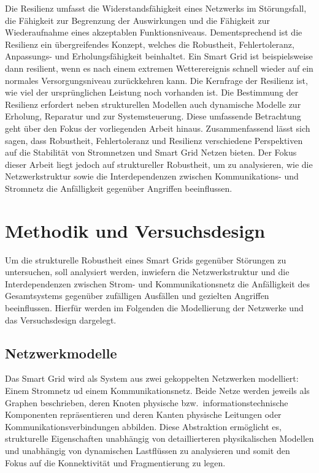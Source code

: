 \documentclass[14pt,a4paper]{scrartcl}
\begin{document}
Die Resilienz umfasst die Widerstandsfähigkeit eines Netzwerks im Störungsfall, die Fähigkeit zur Begrenzung der Auswirkungen und die Fähigkeit zur Wiederaufnahme eines akzeptablen Funktionsniveaus. Dementsprechend ist die Resilienz ein übergreifendes Konzept, welches die Robustheit, Fehlertoleranz, Anpassungs- und Erholungsfähigkeit beinhaltet. Ein Smart Grid ist beispielsweise dann resilient, wenn es nach einem extremen Wetterereignis schnell wieder auf ein normales Versorgungsniveau zurückkehren kann. 
Die Kernfrage der Resilienz ist, wie viel der ursprünglichen Leistung noch vorhanden ist. Die Bestimmung der Resilienz erfordert neben strukturellen Modellen auch dynamische Modelle zur Erholung, Reparatur und zur Systemsteuerung. Diese umfassende Betrachtung geht über den Fokus der vorliegenden Arbeit hinaus. 
Zusammenfassend lässt sich sagen, dass Robustheit, Fehlertoleranz und Resilienz verschiedene Perspektiven auf die Stabilität von Stromnetzen und Smart Grid Netzen bieten. Der Fokus dieser Arbeit liegt jedoch auf struktureller Robustheit, um zu analysieren, wie die Netzwerkstruktur sowie die Interdependenzen zwischen Kommunikations- und Stromnetz die Anfälligkeit gegenüber Angriffen beeinflussen. 

\section{Methodik und Versuchsdesign}

Um die strukturelle Robustheit eines Smart Grids gegenüber Störungen zu untersuchen, soll analysiert werden, inwiefern die Netzwerkstruktur und die Interdependenzen zwischen Strom- und Kommunikationsnetz die Anfälligkeit des Gesamtsystems gegenüber zufälligen Ausfällen und gezielten Angriffen beeinflussen. Hierfür werden im Folgenden die Modellierung der Netzwerke und das Versuchsdesign dargelegt. 

\subsection{Netzwerkmodelle}
Das Smart Grid wird als System aus zwei gekoppelten Netzwerken modelliert: Einem Stromnetz ud einem Kommunikationsnetz. Beide Netze werden jeweils als Graphen beschrieben, deren Knoten physische bzw.\ informationstechnische Komponenten repräsentieren und deren Kanten physische Leitungen oder Kommunikationsverbindungen abbilden. Diese Abstraktion ermöglicht es, strukturelle Eigenschaften unabhängig von detaillierteren physikalischen Modellen und unabhängig von dynamischen Lastflüssen zu analysieren und somit den Fokus auf die Konnektivität und Fragmentierung zu legen. 
\end{document}
